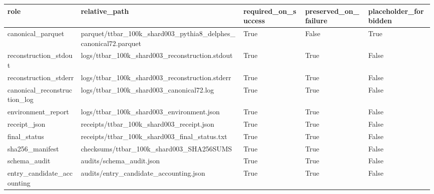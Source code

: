\begin{tabular}{lllll}
\toprule
role & relative\_path & required\_on\_success & preserved\_on\_failure & placeholder\_forbidden \\
\midrule
canonical\_parquet & parquet/ttbar\_100k\_shard003\_pythia8\_delphes\_canonical72.parquet & True & False & True \\
reconstruction\_stdout & logs/ttbar\_100k\_shard003\_reconstruction.stdout & True & True & False \\
reconstruction\_stderr & logs/ttbar\_100k\_shard003\_reconstruction.stderr & True & True & False \\
canonical\_reconstruction\_log & logs/ttbar\_100k\_shard003\_canonical72.log & True & True & False \\
environment\_report & logs/ttbar\_100k\_shard003\_environment.json & True & True & False \\
receipt\_json & receipts/ttbar\_100k\_shard003\_receipt.json & True & True & False \\
final\_status & receipts/ttbar\_100k\_shard003\_final\_status.txt & True & True & False \\
sha256\_manifest & checksums/ttbar\_100k\_shard003\_SHA256SUMS & True & True & False \\
schema\_audit & audits/schema\_audit.json & True & True & False \\
entry\_candidate\_accounting & audits/entry\_candidate\_accounting.json & True & True & False \\
\bottomrule
\end{tabular}
